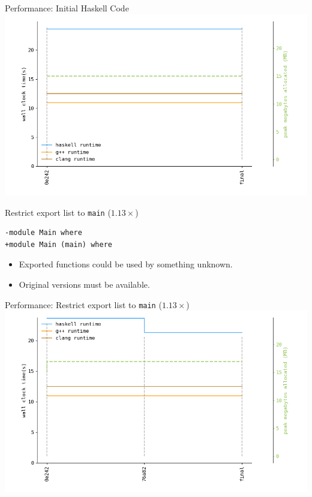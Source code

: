 \documentclass[8pt]{beamer}
\begin{document}
\begin{frame}[fragile]{Performance: Initial Haskell Code}
\includegraphics[height=0.6\textwidth]{perfdata-upto-0e242-gen.png}
\end{frame}


\begin{frame}[fragile]{Restrict export list to \texttt{main} ($1.13\times$)}
\begin{verbatim}
-module Main where
+module Main (main) where
\end{verbatim}

\pause
\begin{itemize}
\item Exported functions could be used by something unknown.
\item Original versions must be available.
\end{itemize}
\end{frame}

\begin{frame}[fragile]{Performance: Restrict export list to \texttt{main} ($1.13\times$)}
\includegraphics[height=0.6\textwidth]{perfdata-upto-76a82-gen.png}
\end{frame}
\end{document}
